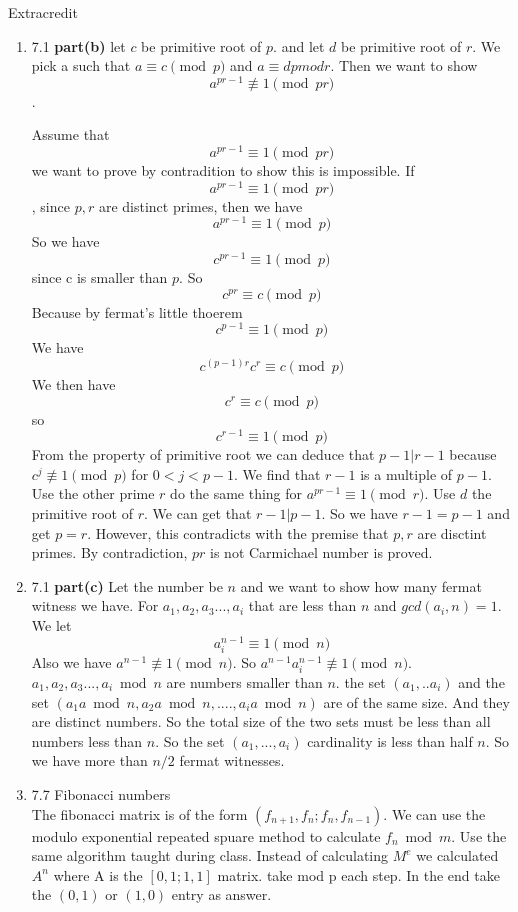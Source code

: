 \documentclass[11pt]{article}
\begin{document}
\pagebreak
Extracredit\\

\begin{enumerate}

\item 7.1 \textbf{part(b)}
let $c$ be  primitive root of $p$.
and let $d$ be primitive root of $r$. 
We pick a such that $a \equiv c \pmod{p}$ and $a \equiv d pmod{r}$. Then we want to show \[a^{pr-1} \not\equiv 1 \pmod{pr}\].

Assume that \[a^{pr-1} \equiv 1 \pmod{pr}\] we want to prove by contradition to show this is impossible. 
If \[a^{pr-1} \equiv 1 \pmod{pr}\] , since $p,r$ are distinct primes, then we have 
\[a^{pr-1} \equiv 1 \pmod{p}\] So we have 
\[c^{pr-1} \equiv 1 \pmod{p}\] since c is smaller than $p$. So
\[c^{pr} \equiv c \pmod p\]
Because by fermat's little thoerem \[c^{p-1} \equiv 1 \pmod{p}\]
We have \[c^{(p-1)r}c^r \equiv c \pmod{p}\]
We then have \[c^r \equiv c \pmod p\]
so \[c^{r-1} \equiv 1 \pmod{p}\]
From the property of primitive root we can deduce that $p-1|r-1$ because $c^j \not\equiv 1 \pmod{p}$ for $0<j<p-1$. We find that $r-1$ is a multiple of $p-1$. \\
Use the other prime $r$ do the same thing for $a^{pr-1} \equiv 1 \pmod{r}$. Use $d$ the primitive root of $r$. We can get that $r-1|p-1$. So we have $r-1 = p-1$ and get $p=r$. However, this contradicts with the premise that $p,r$ are disctint primes. By contradiction, $pr$ is not Carmichael number is proved. 

\item 7.1 \textbf{part(c)}
Let the number be $n$ and we want to show how many fermat witness we have.
For $a_1,a_2,a_3...,a_i$ that are less than $n$ and $gcd(a_i,n) =1$. We let 
\[ a_i^{n-1} \equiv 1 \pmod{n} \]
Also we have $a^{n-1} \not\equiv 1 \pmod{n}$.
So $a^{n-1}a_i^{n-1} \not\equiv 1 \pmod{n}$.
$a_1,a_2,a_3...,a_i \bmod{n}$ are numbers smaller than $n$. the set $({a_1,..a_i})$ and the set $({a_1a \bmod{n}, a_2a\bmod{n}, ....,a_ia\bmod{n}})$ are of the same size. And they are distinct numbers. So the total size of the two sets must be less than all numbers less than $n$. So the set $({a_1,...,a_i})$ cardinality is less than half $n$. So we have more than $n/2$ fermat witnesses.  


\item 7.7 Fibonacci numbers\\
The fibonacci matrix is of the form $(f_{n+1} ,f_{n} ;f_{n}, f_{n-1})$. We can use the modulo exponential repeated spuare method to calculate $f_{n} \bmod m$. Use the same algorithm taught during class. Instead of calculating $M^e$ we calculated $A^n$ where A is the $[0, 1 ; 1, 1]$ matrix. take mod p each step. In the end take the $(0,1)$ or $(1,0)$ entry as answer. 


\end{enumerate}
\end{document}
